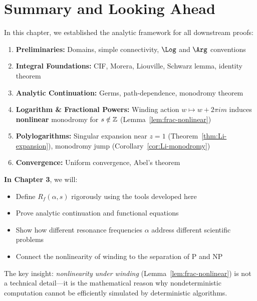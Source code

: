 \section{Summary and Looking Ahead}

In this chapter, we established the analytic framework for all downstream proofs:

\begin{enumerate}
\item \textbf{Preliminaries:} Domains, simple connectivity, $\Log$ and $\Arg$ conventions
\item \textbf{Integral Foundations:} CIF, Morera, Liouville, Schwarz lemma, identity theorem
\item \textbf{Analytic Continuation:} Germs, path-dependence, monodromy theorem
\item \textbf{Logarithm \& Fractional Powers:} Winding action $w \mapsto w + 2\pi i m$ induces \textbf{nonlinear} monodromy for $s \notin \mathbb{Z}$ (Lemma~\ref{lem:frac-nonlinear})
\item \textbf{Polylogarithms:} Singular expansion near $z = 1$ (Theorem~\ref{thm:Li-expansion}), monodromy jump (Corollary~\ref{cor:Li-monodromy})
\item \textbf{Convergence:} Uniform convergence, Abel's theorem
\end{enumerate}

\textbf{In Chapter 3}, we will:
\begin{itemize}
\item Define $R_f(\alpha, s)$ rigorously using the tools developed here
\item Prove analytic continuation and functional equations
\item Show how different resonance frequencies $\alpha$ address different scientific problems
\item Connect the nonlinearity of winding to the separation of P and NP
\end{itemize}

The key insight: \textit{nonlinearity under winding} (Lemma~\ref{lem:frac-nonlinear}) is not a technical detail—it is the mathematical reason why nondeterministic computation cannot be efficiently simulated by deterministic algorithms.


